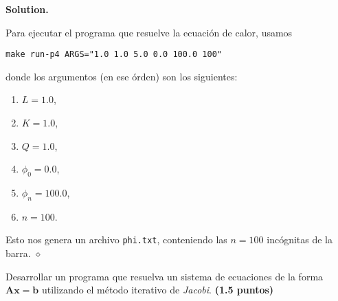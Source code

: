 \documentclass{article}
\theoremstyle{problemstyle}
\newenvironment{solution}{%
  \begin{mdframed}[linewidth=0.8pt,linecolor=Gray,backgroundcolor=Gray!5,roundcorner=5pt]%
  \noindent\textbf{Solution.}%
}{%
\hfill $ \diamond $ 
  \end{mdframed}%
}
\begin{document}
\begin{solution}
	Para ejecutar el programa que resuelve la ecuaci\'on de calor, usamos

	\begin{center}
		\texttt{make run-p4 ARGS="1.0 1.0 5.0 0.0 100.0 100"}
	\end{center}

	donde los argumentos (en ese \'orden) son los siguientes:
	\begin{enumerate}
		\item $ L = 1.0 $,
		\item $ K = 1.0 $,
		\item $ Q = 1.0 $,
		\item $ \phi_0 = 0.0 $,
		\item $ \phi_{n} = 100.0 $,
		\item $ n = 100 $.
	\end{enumerate}
	Esto nos genera un archivo \texttt{phi.txt}, conteniendo las $ n = 100 $ inc\'ognitas de la barra.
\end{solution}

\begin{problem}
Desarrollar un programa que resuelva un sistema de ecuaciones de la forma $
	\mathbf{Ax} = \mathbf{b} $ utilizando el método iterativo de \textit{Jacobi}.
\textbf{(1.5 puntos)}
\end{problem}
\end{document}
